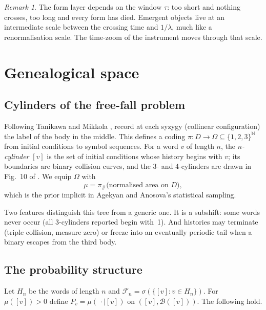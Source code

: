 \documentclass[11pt]{article}
\theoremstyle{remark}
\newtheorem{remark}{Remark}
\newcommand{\N}{\mathbb{N}}
\newcommand{\B}{\mathcal{B}}
\newcommand{\F}{\mathcal{F}}
\begin{document}
\begin{remark}
The form layer depends on the window $\tau$: too short and nothing crosses, too long and every form has died.
Emergent objects live at an intermediate scale between the crossing time and $1/\lambda$, much like a
renormalisation scale. The time-zoom of the instrument moves through that scale.
\end{remark}

\section{Genealogical space}
\label{sec:genealogy}

\subsection{Cylinders of the free-fall problem}

Following Tanikawa and Mikkola \cite{TanikawaMikkola2015}, record at each syzygy (collinear configuration) the
label of the body in the middle. This defines a coding $\pi:D\to\Omega\subseteq\{1,2,3\}^{\N}$ from initial
conditions to symbol sequences. For a word $v$ of length $n$, the \emph{$n$-cylinder} $[v]$ is the set of
initial conditions whose history begins with $v$; its boundaries are binary collision curves, and the 3- and
4-cylinders are drawn in Fig.~10 of \cite{Hristov2024}. We equip $\Omega$ with
\begin{equation}
  \mu=\pi_\#\bigl(\text{normalised area on }D\bigr),
\end{equation}
which is the prior implicit in Agekyan and Anosova's statistical sampling.

Two features distinguish this tree from a generic one. It is a subshift: some words never occur (all
3-cylinders reported begin with~1). And histories may terminate (triple collision, measure zero) or freeze into
an eventually periodic tail when a binary escapes from the third body.

\subsection{The probability structure}

Let $H_n$ be the words of length $n$ and $\F_n=\sigma(\{[v]:v\in H_n\})$. For $\mu([v])>0$ define
$P_v=\mu(\,\cdot\mid[v])$ on $([v],\B([v]))$. The following hold.
\end{document}
